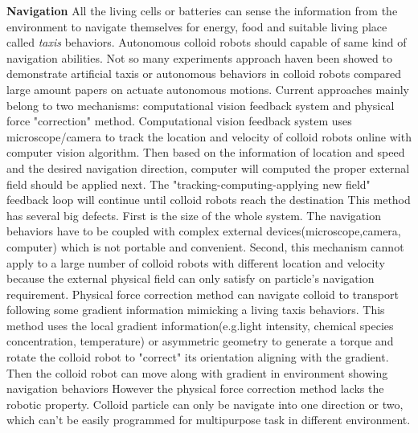 \textbf{Navigation} All the living cells or batteries can sense the information from the environment to navigate themselves for energy, food and suitable living place called \textit{taxis} behaviors. Autonomous colloid robots should capable of same kind of navigation abilities. Not so many experiments approach haven been showed to demonstrate  artificial taxis or autonomous behaviors in colloid robots compared large amount papers on actuate autonomous motions. Current approaches mainly belong to two mechanisms:  computational vision feedback system and physical force "correction" method. Computational vision feedback system uses microscope/camera to track the location and velocity of colloid robots online with computer vision algorithm. Then based on the information of location and speed and the desired navigation direction, computer will computed the proper external field should be applied next. The "tracking-computing-applying new field" feedback loop will continue until colloid robots reach the destination\cite{li2017autonomous,han2017sequence} This method has several big defects. First is the size of the whole system. The navigation behaviors have to be coupled with complex external devices(microscope,camera, computer) which is not portable and convenient. Second, this mechanism cannot apply to a large number of colloid robots with different location and velocity because the external physical field can only satisfy on particle's navigation requirement. Physical force correction method can navigate  colloid to transport following  some gradient information mimicking a living taxis behaviors. This method uses the local gradient information(e.g.light intensity, chemical species concentration, temperature) or asymmetric geometry to generate a torque and rotate  the colloid robot to "correct" its orientation aligning with the gradient. Then the colloid robot can move along with gradient in environment showing navigation behaviors \cite{brosseau2019relating,ten2014gravitaxis,lozano2016phototaxis,baker2019fight} However the physical force correction method  lacks the robotic property. Colloid particle can only be navigate into one direction or two, which can't be easily programmed for multipurpose task in different environment. 





